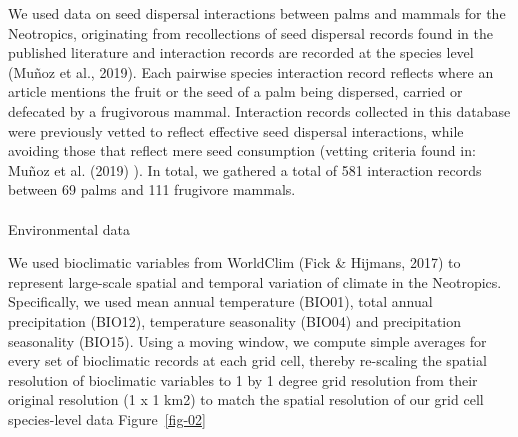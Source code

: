 \documentclass[
]{agujournal2019}
\makeatletter
\let\oldparagraph\paragraph
\renewcommand{\paragraph}{
    \@ifstar
      \xxxParagraphStar
      \xxxParagraphNoStar
  }
\newcommand{\xxxParagraphStar}[1]{\oldparagraph*{#1}\mbox{}}
\newcommand{\xxxParagraphNoStar}[1]{\oldparagraph{#1}\mbox{}}
\makeatother
\begin{document}
We used data on seed dispersal interactions between palms and mammals
for the Neotropics, originating from recollections of seed dispersal
records found in the published literature and interaction records are
recorded at the species level (Muñoz et al., 2019). Each pairwise
species interaction record reflects where an article mentions the fruit
or the seed of a palm being dispersed, carried or defecated by a
frugivorous mammal. Interaction records collected in this database were
previously vetted to reflect effective seed dispersal interactions,
while avoiding those that reflect mere seed consumption (vetting
criteria found in: Muñoz et al. (2019) ). In total, we gathered a total
of 581 interaction records between 69 palms and 111 frugivore mammals.

\paragraph{Environmental data}\label{environmental-data}

We used bioclimatic variables from WorldClim (Fick \& Hijmans, 2017) to
represent large-scale spatial and temporal variation of climate in the
Neotropics. Specifically, we used mean annual temperature (BIO01), total
annual precipitation (BIO12), temperature seasonality (BIO04) and
precipitation seasonality (BIO15). Using a moving window, we compute
simple averages for every set of bioclimatic records at each grid cell,
thereby re-scaling the spatial resolution of bioclimatic variables to 1
by 1 degree grid resolution from their original resolution (1 x 1 km2)
to match the spatial resolution of our grid cell species-level data
Figure~\ref{fig-02}
\end{document}

